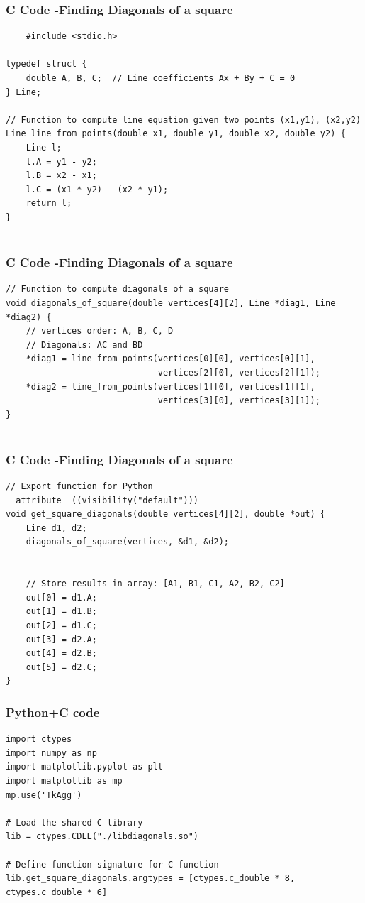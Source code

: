 \documentclass{beamer}
\begin{document}
\begin{frame}[fragile]
    \frametitle{C Code -Finding Diagonals of a square}

    \begin{lstlisting}
    #include <stdio.h>

typedef struct {
    double A, B, C;  // Line coefficients Ax + By + C = 0
} Line;

// Function to compute line equation given two points (x1,y1), (x2,y2)
Line line_from_points(double x1, double y1, double x2, double y2) {
    Line l;
    l.A = y1 - y2;
    l.B = x2 - x1;
    l.C = (x1 * y2) - (x2 * y1);
    return l;
}


    \end{lstlisting}
\end{frame}

\begin{frame}[fragile]
    \frametitle{C Code -Finding Diagonals of a square}

    \begin{lstlisting}
// Function to compute diagonals of a square
void diagonals_of_square(double vertices[4][2], Line *diag1, Line *diag2) {
    // vertices order: A, B, C, D
    // Diagonals: AC and BD
    *diag1 = line_from_points(vertices[0][0], vertices[0][1],
                              vertices[2][0], vertices[2][1]);
    *diag2 = line_from_points(vertices[1][0], vertices[1][1],
                              vertices[3][0], vertices[3][1]);
}


    \end{lstlisting}
\end{frame}

\begin{frame}[fragile]
    \frametitle{C Code -Finding Diagonals of a square}

    \begin{lstlisting}
// Export function for Python
__attribute__((visibility("default"))) 
void get_square_diagonals(double vertices[4][2], double *out) {
    Line d1, d2;
    diagonals_of_square(vertices, &d1, &d2);


    // Store results in array: [A1, B1, C1, A2, B2, C2]
    out[0] = d1.A;
    out[1] = d1.B;
    out[2] = d1.C;
    out[3] = d2.A;
    out[4] = d2.B;
    out[5] = d2.C;
}

    \end{lstlisting}
\end{frame}

\begin{frame}[fragile]
    \frametitle{Python+C code}

    \begin{lstlisting}
import ctypes
import numpy as np
import matplotlib.pyplot as plt
import matplotlib as mp
mp.use('TkAgg')

# Load the shared C library
lib = ctypes.CDLL("./libdiagonals.so")

# Define function signature for C function
lib.get_square_diagonals.argtypes = [ctypes.c_double * 8, ctypes.c_double * 6]

    \end{lstlisting}
\end{frame}
\end{document}
